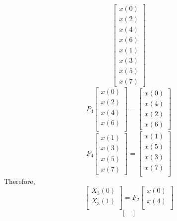 \documentclass[journal,12pt,twocolumn]{IEEEtran}
\renewcommand\thesection{\arabic{section}}
\begin{document}
\begin{enumerate}[label=\arabic*.,ref=\thesection.\theenumi]
\begin{equation}
\begin{bmatrix}
			x(0) \\ 
			x(2) \\ 
			x(4) \\ 
			x(6) \\
			x(1) \\ 
			x(3) \\ 
			x(5) \\
			x(7)
		\end{bmatrix}
	\end{equation}
	\begin{equation}
		P_{4}
		\begin{bmatrix}
			x(0) \\ 
			x(2) \\ 
			x(4) \\ 
			x(6) \\
		\end{bmatrix}
		= 
		\begin{bmatrix}
			x(0) \\ 
			x(4) \\ 
			x(2) \\
			x(6)
		\end{bmatrix}
	\end{equation}
	\begin{equation}
		P_{4}
		\begin{bmatrix}
			x(1) \\ 
			x(3) \\ 
			x(5) \\
			x(7)
		\end{bmatrix}
		= 
		\begin{bmatrix}
			x(1) \\ 
			x(5) \\ 
			x(3) \\ 
			x(7) \\
		\end{bmatrix}
	\end{equation}
	Therefore,
	\begin{equation}
		\begin{bmatrix}
			X_{3}(0) \\ 
			X_{3}(1)\\ 
		\end{bmatrix}
		= F_{2}
		\begin{bmatrix}
			x(0) \\ 
			x(4) \\ 
		\end{bmatrix}
	\end{equation}
	\begin{equation}
		\begin{bmatrix}

\end{bmatrix}
\end{equation}
\end{enumerate}
\end{document}
